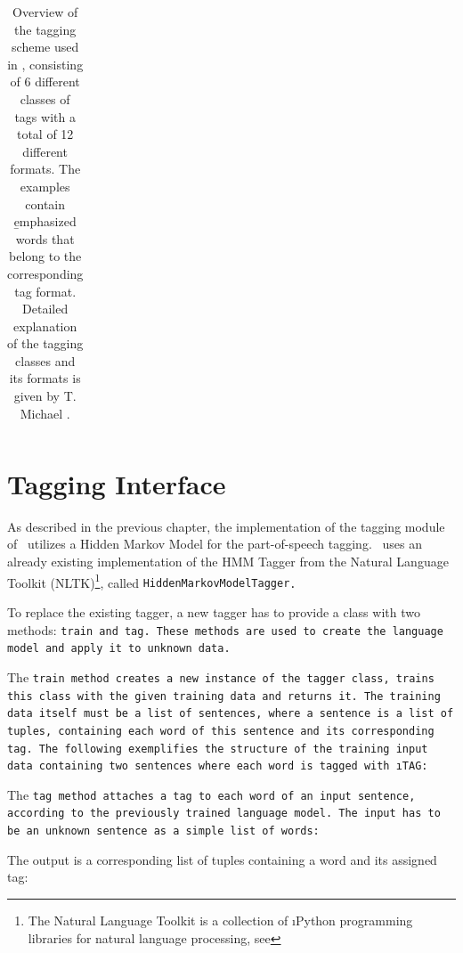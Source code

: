 \begin{table}[H]
\begin{tabular}{|c|>{\raggedright}p{50mm}|p{35mm}|p{40mm}|}
	\end{tabular}
	\caption[Tagging Scheme Overview]{Overview of the tagging scheme used in \Alex, consisting of 6 different classes of tags with a total of 12 different formats. The examples contain \b{emphasized} words that belong to the corresponding tag format. Detailed explanation of the tagging classes and its formats is given by T. Michael \cite{michael2016}.}
	\label{t.tagging_scheme}
	\vspace{1ex}
\end{table}

\section{Tagging Interface}\label{c.alex.tagging}
As described in the previous chapter, the implementation of the tagging module of \Alex\ utilizes a Hidden Markov Model for the part-of-speech tagging. \Alex\ uses an already existing implementation of the HMM Tagger from the Natural Language Toolkit (NLTK)\footnote{The Natural Language Toolkit is a collection of \i{Python} programming libraries for natural language processing, see }, called \tt{HiddenMarkovModelTagger}.

To replace the existing tagger, a new tagger has to provide a class with two methods: \tt{train} and \tt{tag}. These methods are used to create the language model and apply it to unknown data.

The \tt{train} method creates a new instance of the tagger class, trains this class with the given training data and returns it. The training data itself must be a list of sentences, where a sentence is a list of tuples, containing each word of this sentence and its corresponding tag. The following exemplifies the structure of the training input data containing two sentences where each word is tagged with \i{TAG}:



The \tt{tag} method attaches a tag to each word of an input sentence, according to the previously trained language model. The input has to be an unknown sentence as a simple list of words:



The output is a corresponding list of tuples containing a word and its assigned tag:




